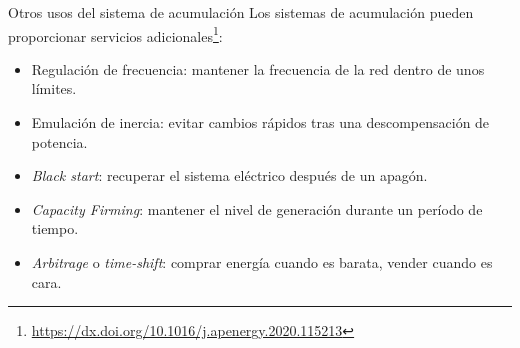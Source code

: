\documentclass[aspectratio=169, usenames,svgnames,dvipsnames]{beamer}
\begin{document}
\begin{frame}[label={sec:orgce9eb2c}]{Otros usos del sistema de acumulación}
Los sistemas de acumulación pueden proporcionar servicios adicionales\footnote{\url{https://dx.doi.org/10.1016/j.apenergy.2020.115213}}:

\begin{itemize}
\item \alert{Regulación de frecuencia}: mantener la frecuencia de la red dentro de unos límites.
\item \alert{Emulación de inercia}: evitar cambios rápidos tras una descompensación de potencia.
\item \alert{\emph{Black start}}: recuperar el sistema eléctrico después de un apagón.
\item \alert{\emph{Capacity Firming}}: mantener el nivel de generación durante un período de tiempo.
\item \alert{\emph{Arbitrage}} o \emph{time-shift}: comprar energía cuando es barata, vender cuando es cara.
\end{itemize}
\end{frame}
\end{document}
